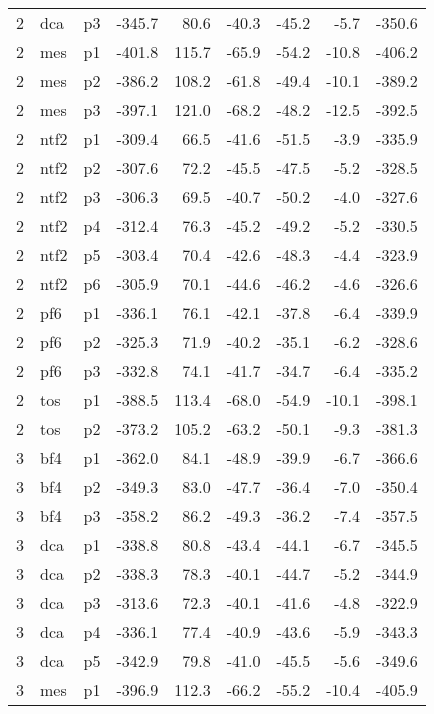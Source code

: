 \documentclass[a4paper]{article}
\begin{document}
\begin{table}[ht]
\begin{tabular}{rllrrrrrr}
   2 & dca & p3 & -345.7 & 80.6 & -40.3 & -45.2 & -5.7 & -350.6 \\ 
   2 & mes & p1 & -401.8 & 115.7 & -65.9 & -54.2 & -10.8 & -406.2 \\ 
   2 & mes & p2 & -386.2 & 108.2 & -61.8 & -49.4 & -10.1 & -389.2 \\ 
   2 & mes & p3 & -397.1 & 121.0 & -68.2 & -48.2 & -12.5 & -392.5 \\ 
   2 & ntf2 & p1 & -309.4 & 66.5 & -41.6 & -51.5 & -3.9 & -335.9 \\ 
   2 & ntf2 & p2 & -307.6 & 72.2 & -45.5 & -47.5 & -5.2 & -328.5 \\ 
   2 & ntf2 & p3 & -306.3 & 69.5 & -40.7 & -50.2 & -4.0 & -327.6 \\ 
   2 & ntf2 & p4 & -312.4 & 76.3 & -45.2 & -49.2 & -5.2 & -330.5 \\ 
   2 & ntf2 & p5 & -303.4 & 70.4 & -42.6 & -48.3 & -4.4 & -323.9 \\ 
   2 & ntf2 & p6 & -305.9 & 70.1 & -44.6 & -46.2 & -4.6 & -326.6 \\ 
   2 & pf6 & p1 & -336.1 & 76.1 & -42.1 & -37.8 & -6.4 & -339.9 \\ 
   2 & pf6 & p2 & -325.3 & 71.9 & -40.2 & -35.1 & -6.2 & -328.6 \\ 
   2 & pf6 & p3 & -332.8 & 74.1 & -41.7 & -34.7 & -6.4 & -335.2 \\ 
   2 & tos & p1 & -388.5 & 113.4 & -68.0 & -54.9 & -10.1 & -398.1 \\ 
   2 & tos & p2 & -373.2 & 105.2 & -63.2 & -50.1 & -9.3 & -381.3 \\ 
   3 & bf4 & p1 & -362.0 & 84.1 & -48.9 & -39.9 & -6.7 & -366.6 \\ 
   3 & bf4 & p2 & -349.3 & 83.0 & -47.7 & -36.4 & -7.0 & -350.4 \\ 
   3 & bf4 & p3 & -358.2 & 86.2 & -49.3 & -36.2 & -7.4 & -357.5 \\ 
   3 & dca & p1 & -338.8 & 80.8 & -43.4 & -44.1 & -6.7 & -345.5 \\ 
   3 & dca & p2 & -338.3 & 78.3 & -40.1 & -44.7 & -5.2 & -344.9 \\ 
   3 & dca & p3 & -313.6 & 72.3 & -40.1 & -41.6 & -4.8 & -322.9 \\ 
   3 & dca & p4 & -336.1 & 77.4 & -40.9 & -43.6 & -5.9 & -343.3 \\ 
   3 & dca & p5 & -342.9 & 79.8 & -41.0 & -45.5 & -5.6 & -349.6 \\ 
   3 & mes & p1 & -396.9 & 112.3 & -66.2 & -55.2 & -10.4 & -405.9 \\ 

\end{tabular}
\end{table}
\end{document}
